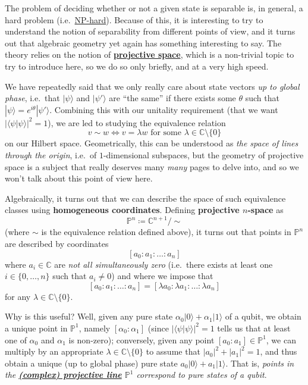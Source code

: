 \documentclass[fleqn]{article}
\newenvironment{technical}{\noindent}{\medskip}
\begin{document}
\begin{technical}
The problem of deciding whether or not a given state is separable is, in general, a hard problem (i.e.~\href{https://en.wikipedia.org/wiki/NP-hardness}{NP-hard}).
Because of this, it is interesting to try to understand the notion of separability from different points of view, and it turns out that algebraic geometry yet again has something interesting to say.
The theory relies on the notion of \href{https://en.wikipedia.org/wiki/Projective_space}{\textbf{projective space}}, which is a non-trivial topic to try to introduce here, so we do so only briefly, and at a very high speed.

We have repeatedly said that we only really care about state vectors \emph{up to global phase}, i.e.~that \(|\psi\rangle\) and \(|\psi'\rangle\) are ``the same'' if there exists some \(\theta\) such that \(|\psi\rangle=e^{i\theta}|\psi'\rangle\).
Combining this with our unitality requirement (that we want \(|\langle\psi|\psi\rangle|^2=1\)), we are led to studying the equivalence relation
\[
  v\sim w \iff v=\lambda w \text{ for some }\lambda\in\mathbb{C}\setminus\{0\}
\]
on our Hilbert space.
Geometrically, this can be understood as \emph{the space of lines through the origin}, i.e.~of \(1\)-dimensional subspaces, but the geometry of projective space is a subject that really deserves many \emph{many} pages to delve into, and so we won't talk about this point of view here.

Algebraically, it turns out that we can describe the space of such equivalence classes using \textbf{homogeneous coordinates}.
Defining \textbf{projective \(n\)-space} as
\[
  \mathbb{P}^n
  \coloneqq \mathbb{C}^{n+1}/\sim
\]
(where \(\sim\) is the equivalence relation defined above), it turns out that points in \(\mathbb{P}^n\) are described by coordinates
\[
  [a_0:a_1:\ldots:a_n]
\]
where \(a_i\in\mathbb{C}\) are \emph{not all simultaneously zero} (i.e.~there exists at least one \(i\in\{0,\ldots,n\}\) such that \(a_i\neq0\)) and where we impose that
\[
  [a_0:a_1:\ldots:a_n]
  = [\lambda a_0:\lambda a_1:\ldots:\lambda a_n]
\]
for any \(\lambda\in\mathbb{C}\setminus\{0\}\).

Why is this useful?
Well, given any pure state \(\alpha_0|0\rangle+\alpha_1|1\rangle\) of a qubit, we obtain a unique point in \(\mathbb{P}^1\), namely \([\alpha_0:\alpha_1]\) (since \(|\langle\psi|\psi\rangle|^2=1\) tells us that at least one of \(\alpha_0\) and \(\alpha_1\) is non-zero);
conversely, given any point \([a_0:a_1]\in\mathbb{P}^1\), we can multiply by an appropriate \(\lambda\in\mathbb{C}\setminus\{0\}\) to assume that \(|a_0|^2+|a_1|^2=1\), and thus obtain a unique (up to global phase) pure state \(a_0|0\rangle+a_1|1\rangle\).
That is, \emph{points in the \href{https://en.wikipedia.org/wiki/Riemann_sphere}{\textbf{(complex) projective line}} \(\mathbb{P}^1\) correspond to pure states of a qubit}.


\end{technical}
\end{document}
